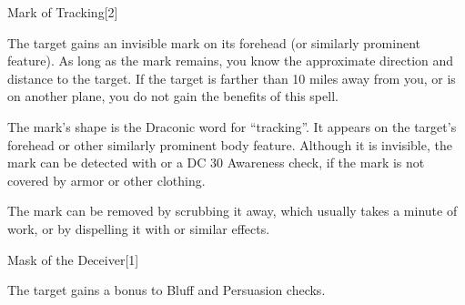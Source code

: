 \begin{spellsection}{Mark of Tracking}[2]
    \begin{spellheader}
    \end{spellheader}
    \begin{spellcontent}
        \begin{spelltargetinginfo}
        \end{spelltargetinginfo}
        \begin{spelleffects}
            \spelleffect The target gains an invisible mark on its forehead (or similarly prominent feature).
            As long as the mark remains, you know the approximate direction and distance to the target.
            If the target is farther than 10 miles away from you, or is on another plane, you do not gain the benefits of this spell.
            \spelldur \durlong
        \end{spelleffects}
    \end{spellcontent}
    \begin{spellfooter}
        \spellnotes The mark's shape is the Draconic word for ``tracking''.
        It appears on the target's forehead or other similarly prominent body feature.
        Although it is invisible, the mark can be detected with  or a DC 30 Awareness check, if the mark is not covered by armor or other clothing.

        The mark can be removed by scrubbing it away, which usually takes a minute of work, or by dispelling it with  or similar effects.
        \miscastrandom
    \end{spellfooter}
\end{spellsection}

\begin{spellsection}{Mask of the Deceiver}[1]
    \begin{spellheader}
    \end{spellheader}
    \begin{spellcontent}
        \begin{spelltargetinginfo}
        \end{spelltargetinginfo}
        \begin{spelleffects}
            \spelleffect The target gains a  bonus to Bluff and Persuasion checks.
        \end{spelleffects}
    \end{spellcontent}
    \begin{spellfooter}
        \miscastexplode
    \end{spellfooter}
\end{spellsection}

